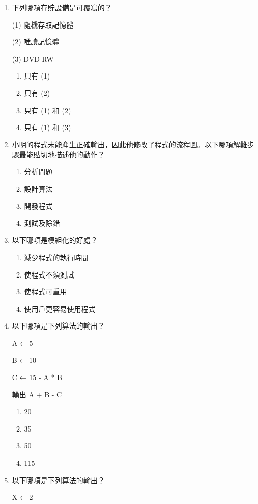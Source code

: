 \documentclass[12pt,a4paper]{article}
\begin{document}
\begin{enumerate}
\item 下列哪項存貯設備是可覆寫的？

(1) 隨機存取記憶體

(2) 唯讀記憶體

(3) DVD-RW

\begin{enumerate}[label=\Alph*.]
\item 只有 (1)
\item 只有 (2)
\item 只有 (1) 和 (2)
\item 只有 (1) 和 (3)
\end{enumerate}

\item 小明的程式未能產生正確輸出，因此他修改了程式的流程圖。以下哪項解難步驟最能貼切地描述他的動作？

\begin{enumerate}[label=\Alph*.]
\item 分析問題
\item 設計算法
\item 開發程式
\item 測試及除錯
\end{enumerate}

\item 以下哪項是模組化的好處？

\begin{enumerate}[label=\Alph*.]
\item 減少程式的執行時間
\item 使程式不須測試
\item 使程式可重用
\item 使用戶更容易使用程式
\end{enumerate}

\item 以下哪項是下列算法的輸出？

A ← 5

B ← 10

C ← 15 - A * B

輸出 A + B - C

\begin{enumerate}[label=\Alph*.]
\item 20
\item 35
\item 50
\item 115
\end{enumerate}

\item 以下哪項是下列算法的輸出？

X ← 2


\end{enumerate}
\end{document}
